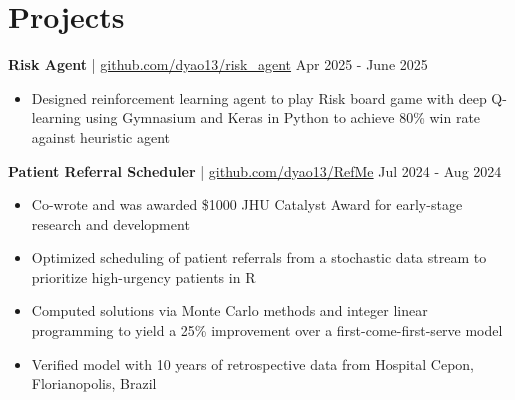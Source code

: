 \documentclass[11pt]{article}       %
\begin{document}

\vspace{-18.5pt}

\section*{Projects}

\textbf{Risk Agent} | \href{https://github.com/dyao13/risk_agent}{github.com/dyao13/risk\_agent} \hfill Apr 2025 - June 2025 \vspace{-9pt} \\
\begin{itemize}
  \item Designed reinforcement learning agent to play Risk board game with deep Q-learning using Gymnasium and Keras in Python to achieve 80\% win rate against heuristic agent
\end{itemize}

\textbf{Patient Referral Scheduler} | \href{https://github.com/dyao13/RefMe}{github.com/dyao13/RefMe} \hfill Jul 2024 - Aug 2024 \vspace{-9pt} \\
\begin{itemize}
  \item Co-wrote and was awarded \$1000 JHU Catalyst Award for early-stage research and development
  \item Optimized scheduling of patient referrals from a stochastic data stream to prioritize high-urgency patients in R
  \item Computed solutions via Monte Carlo methods and integer linear programming to yield a 25\% improvement over a first-come-first-serve model
  \item Verified model with 10 years of retrospective data from Hospital Cepon, Florianopolis, Brazil
\end{itemize}
\end{document}
